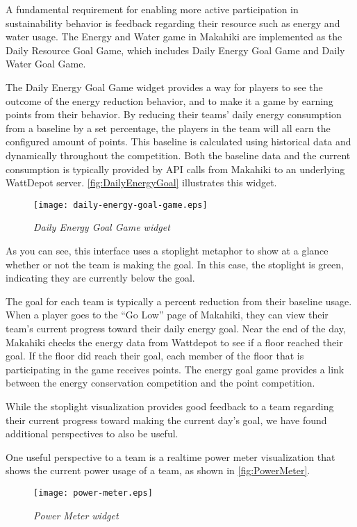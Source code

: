 A fundamental requirement for enabling more active participation in sustainability behavior is feedback regarding their resource such as energy and water usage. The Energy and Water game in Makahiki are implemented as the Daily Resource Goal Game, which includes Daily Energy Goal Game and Daily Water Goal Game.

The Daily Energy Goal Game widget provides a way for players to see the outcome of the energy reduction behavior, and to make it a game by earning points from their behavior. By reducing their teams' daily energy consumption from a baseline by a set percentage, the players in the team will all earn the configured amount of points. This baseline is calculated using historical data and dynamically throughout the competition. Both the baseline data and the current consumption is typically provided by API calls from Makahiki to an underlying WattDepot server.
\autoref{fig:DailyEnergyGoal} illustrates this widget.

\begin{figure}[!ht]
  \center
  \texttt{[image: daily-energy-goal-game.eps]}
  \caption{\em Daily Energy Goal Game widget}
  \label{fig:DailyEnergyGoal}
\end{figure}

As you can see, this interface uses a stoplight metaphor to show at a glance whether or not the team is making the goal. In this case, the stoplight is green, indicating they are currently below the goal.

The goal for each team is typically a percent reduction from their baseline usage. When a player goes to the ``Go Low'' page of Makahiki, they can view their team's current progress toward their daily energy goal. Near the end of the day, Makahiki checks the energy data from Wattdepot to see if a floor reached their goal. If the floor did reach their goal, each member of the floor that is participating in the game receives points. The energy goal game provides a link between the energy conservation competition and the point competition.

While the stoplight visualization provides good feedback to a team regarding their current progress toward making the current day's goal, we have found additional perspectives to also be useful.

One useful perspective to a team is a realtime power meter visualization that shows the current power usage of a team, as shown in \autoref{fig:PowerMeter}.

\begin{figure}[!ht]
  \center
  \texttt{[image: power-meter.eps]}
  \caption{\em Power Meter widget}
  \label{fig:PowerMeter}
\end{figure}

